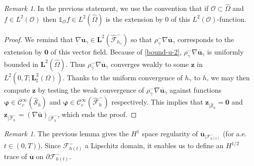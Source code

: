 \documentclass[JEP,XML,SOM,Unicode,NoFloatCountersInSection]{cedram}
\let\mathcal\mathscr
\theoremstyle{remark}
\newtheorem{remark}[theorem]{Remark}
\theoremstyle{definition}
\newcommand{\ug}{\boldsymbol{u}}
\newcommand{\BS}[1]{\boldsymbol{#1}}
\let\CM\Omega
\begin{document}
\begin{remark}
In the previous statement, we use the convention that if $\mathcal O \subset \widehat{\Omega}$ and $f \in L^2(\mathcal O)$ then $\mathds{1}_{\mathcal O} f \in L^2(\widehat{\Omega})$ is the extension by $0$ of this $L^2(\mathcal O)$-function.
\end{remark}
\begin{proof}
We remind that $\nabla \overline{\ug}_{\gamma} \in \BS{L}^2(\widehat{\mathcal F}^{-}_{h_{\gamma}})$ so that $\rho_\gamma^-\nabla \overline{\ug}_{\gamma}$ corresponds to the extension by $\BS{0}$ of this vector field. Because of \eqref{bound-u-2}, $\rho_\gamma^-\nabla \overline{\ug}_{\gamma}$ is uniformly bounded in $\BS{L}^{2}(\widehat{\Omega})$. Thus $\rho^-_\gamma \nabla \overline{\ug}_{\gamma}$ converges weakly to some $\BS{z}$ in $L^{2}(0,T;\BS{L}_\sharp^{2}(\CM))$. Thanks to the uniform convergence of $h_{\gamma}$ to $h$, we may then compute $\BS{z}$ by testing
the weak convergence of $\rho^-_\gamma \nabla \overline{\ug}_{\gamma}$ against
functions $\BS{\varphi} \in \mathcal C^{\infty}_c(\widehat{\mathcal S}_h)$ and
$\BS{\varphi} \in \mathcal C^{\infty}_c(\widehat{\mathcal F}_h^{-})$ respectively. This implies that $\BS{z}_{\vert\widehat{\mathcal{S}}_h}=\BS{0}$ and
$\BS{z}_{\vert\widehat{\mathcal{F}}^-_{h}}=(\nabla \overline{\ug})_{\vert\widehat{\mathcal{F}}^-_{h}}$, which ends the proof.
\end{proof}

\begin{remark}
The previous lemma gives the $H^1$ space regularity of $\overline{\ug}_{|{\mathcal{F}^-_{h(t)}}}$ (for a.e. $t \in (0,T)$). Since $\mathcal{F}^-_{h(t)}$ a Lipschitz domain, it enables us to define an $H^{1/2}$ trace of $\overline{\ug}$ on ${\partial \mathcal F^-_{h(t)}}$.
\end{remark}
\end{document}
